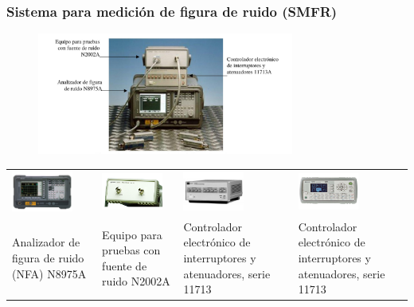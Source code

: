 \documentclass[xcolor=pdftext, table]{beamer}
\begin{document}
	\begin{frame}
		\frametitle{Sistema para medición de figura de ruido (SMFR)}	
	
		\begin{figure}		
			\includegraphics[height=4cm]{Imagenes/SistemaMedicionFiguraRuido.pdf}	
		\end{figure}			

		\begin{table}
			\begin{tabular}{p{2cm}p{2cm}p{2cm}p{2cm}}
				\begin{minipage}{2cm}
					\includegraphics[width=2cm]{Imagenes/N8975A.pdf}
				\end{minipage} &	
				\begin{minipage}{2cm}
					\includegraphics[width=2cm]{Imagenes/N2002A.pdf}
				\end{minipage} &							
				\begin{minipage}{2cm}
					\includegraphics[width=2cm]{Imagenes/11713A.pdf}
				\end{minipage} &	
				\begin{minipage}{2cm}
					\includegraphics[width=2cm]{Imagenes/11713B.pdf}
				\end{minipage} \\
													
				{\scriptsize Analizador de figura de ruido (NFA) N8975A} &
				{\scriptsize Equipo para pruebas con fuente de ruido N2002A} &							
				{\scriptsize Controlador electrónico de interruptores y atenuadores, serie 11713} &
				{\scriptsize Controlador electrónico de interruptores y atenuadores, serie 11713} 
				
			\end{tabular}
		\end{table}	
	\end{frame}
\end{document}
